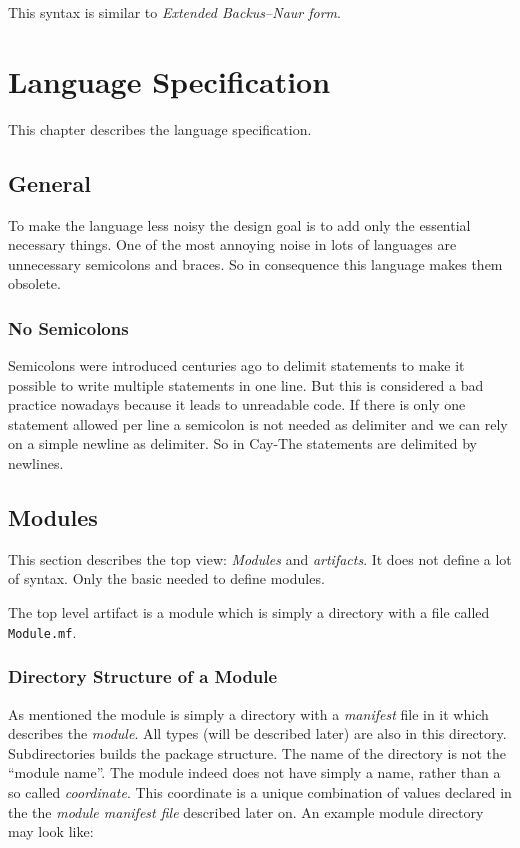 \documentclass[11pt,a4paper]{report}
\begin{document}
This syntax is similar to \textit{Extended Backus–Naur form}\cite{ebnf-wiki}.

\chapter{Language Specification}

This chapter describes the language specification.

\section{General}

To make the language less noisy the design goal is to add only the essential necessary things. One of the most annoying noise in lots of languages are unnecessary semicolons and braces. So in consequence this language makes them obsolete.

\subsection{No Semicolons}

Semicolons were introduced centuries ago to delimit statements to make it possible to write multiple statements in one line. But this is considered a bad practice nowadays because it leads to unreadable code. If there is only one statement allowed per line a semicolon is  not needed as delimiter and we can rely on a simple newline as delimiter. So in Cay-The statements are delimited by newlines.

\section{Modules}

This section describes the top view: \textit{Modules} and \textit{artifacts}. It does not define a lot of syntax. Only the basic needed to define modules.

The top level artifact is a module which is simply a directory with a file called \texttt{Module.mf}.

\subsection{Directory Structure of a Module}

As mentioned the module is simply a directory with a \textit{manifest} file in it which describes the \textit{module}. All types (will be described later) are also in this directory. Subdirectories builds the package structure. The name of the directory is not the ``module name''. The module indeed does not have simply a name, rather than a so called \textit{coordinate}. This coordinate is a unique combination of values declared in the the \textit{module manifest file} described later on. An example module directory may look like:
\\
\end{document}
